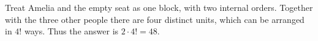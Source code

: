 Treat Amelia and the empty seat as one block, with two internal orders. Together with the three other people there are four distinct units, which can be arranged in $ 4!$ ways. Thus the answer is $ 2\cdot4!=\boxed{48}$.
